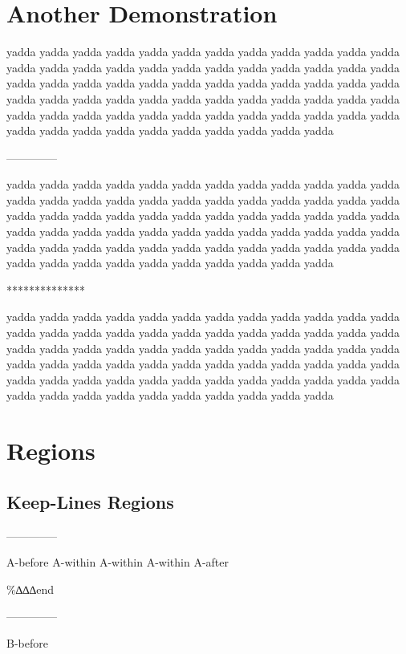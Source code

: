 \chapter{Another Demonstration
}


yadda yadda yadda yadda yadda yadda yadda yadda yadda yadda
yadda yadda yadda yadda yadda yadda yadda yadda yadda yadda
yadda yadda yadda yadda yadda yadda yadda yadda yadda yadda
yadda yadda yadda yadda yadda yadda yadda yadda yadda yadda
yadda yadda yadda yadda yadda yadda yadda yadda yadda yadda
yadda yadda yadda yadda yadda yadda yadda yadda yadda yadda
yadda yadda yadda yadda yadda yadda yadda yadda yadda yadda\par
--------------


yadda yadda yadda yadda yadda yadda yadda yadda yadda yadda
yadda yadda yadda yadda yadda yadda yadda yadda yadda yadda
yadda yadda yadda yadda yadda yadda yadda yadda yadda yadda
yadda yadda yadda yadda yadda yadda yadda yadda yadda yadda
yadda yadda yadda yadda yadda yadda yadda yadda yadda yadda
yadda yadda yadda yadda yadda yadda yadda yadda yadda yadda
yadda yadda yadda yadda yadda yadda yadda yadda yadda yadda\par
**************


yadda yadda yadda yadda yadda yadda yadda yadda yadda yadda
yadda yadda yadda yadda yadda yadda yadda yadda yadda yadda
yadda yadda yadda yadda yadda yadda yadda yadda yadda yadda
yadda yadda yadda yadda yadda yadda yadda yadda yadda yadda
yadda yadda yadda yadda yadda yadda yadda yadda yadda yadda
yadda yadda yadda yadda yadda yadda yadda yadda yadda yadda
yadda yadda yadda yadda yadda yadda yadda yadda yadda yadda\par
\chapter{Regions
}

\section{Keep-Lines Regions
}

--------------


A-before
\begingroup\obeyalllines{}A-within
A-within
A-within
\endgroup{}A-after\par

\%∆∆∆end\par
--------------


B-before\par


